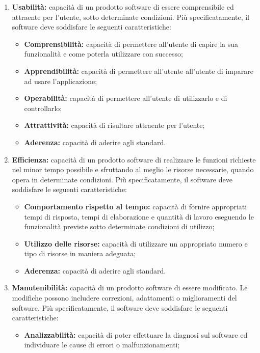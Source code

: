 \begin{enumerate}
\begin{itemize}
 	\end{itemize}
 	\item \textbf{Usabilità:} capacità di un prodotto software di essere comprensibile ed attraente per l’utente, sotto determinate condizioni. Più specificatamente, il software deve soddisfare le seguenti caratteristiche:
 	\begin{itemize}
 		\item \textbf{Comprensibilità:} capacità di permettere all’utente di capire la sua funzionalità e come poterla utilizzare con successo;
 		\item \textbf{Apprendibilità:} capacità di permettere all’utente all’utente di imparare ad usare l’applicazione;
 		\item \textbf{Operabilità:} capacità di permettere all’utente di utilizzarlo e di controllarlo;
 		\item \textbf{Attrattività:} capacità di risultare attraente per l’utente;
 		\item \textbf{Aderenza:} capacità di aderire agli standard.
 	\end{itemize}
 	\item \textbf{Efficienza:} capacità di un prodotto software di realizzare le funzioni richieste nel minor tempo possibile e sfruttando al meglio le risorse necessarie, quando opera in determinate condizioni. Più specificatamente, il software deve soddisfare le seguenti caratteristiche:
 	\begin{itemize}
 		\item \textbf{Comportamento rispetto al tempo:} capacità di fornire appropriati tempi di risposta, tempi di elaborazione e quantità di lavoro eseguendo le funzionalità previste sotto determinate condizioni di utilizzo;
 		\item \textbf{Utilizzo delle risorse:} capacità di utilizzare un appropriato numero e tipo di risorse in maniera adeguata;
 		\item \textbf{Aderenza:} capacità di aderire agli standard.
 	\end{itemize}
 	\item \textbf{Manutenibilità:} capacità di un prodotto software di essere modificato. Le modifiche possono includere correzioni, adattamenti o miglioramenti del software. Più specificatamente, il software deve soddisfare le seguenti caratteristiche:
 	\begin{itemize}
 		\item \textbf{Analizzabilità:} capacità di poter effettuare la diagnosi sul software ed individuare le cause di errori o malfunzionamenti;

\end{itemize}
\end{enumerate}
